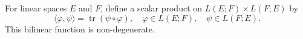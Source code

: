 For linear spaces $E$ and $F$, define a scalar product on $L(E;F) \times L(F;E)$ by
$$\langle \varphi, \psi \rangle = \operatorname{tr} (\psi \circ \varphi), \quad \varphi \in L(E;F), \quad \psi \in L(F;E).$$
This bilinear function is non-degenerate.
